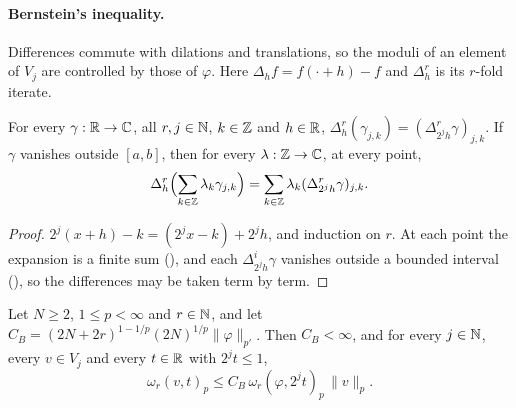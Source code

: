 \paragraph{Bernstein's inequality.}
Differences commute with dilations and translations, so the moduli of an element of $V_j$ are
controlled by those of $\varphi$. Here $\Delta_h f = f(\cdot + h) - f$ and $\Delta_h^r$ is its
$r$-fold iterate.

\begin{lemma}
\label{lem:daub-expansion-differences}
\leanok
{}
For every $\gamma : \mathbb{R} \to \mathbb{C}$, all $r, j \in \mathbb{N}$, $k \in \mathbb{Z}$ and $h \in \mathbb{R}$,
$\Delta_h^r (\gamma_{j,k}) = (\Delta_{2^j h}^r \gamma)_{j,k}$. If $\gamma$ vanishes outside
$[a, b]$, then for every $\lambda : \mathbb{Z} \to \mathbb{C}$, at every point,
\[
  \Delta_h^r \Bigl(\sum_{k \in \mathbb{Z}} \lambda_k \gamma_{j,k}\Bigr)
  = \sum_{k \in \mathbb{Z}} \lambda_k (\Delta_{2^j h}^r \gamma)_{j,k} .
\]
\end{lemma}

\begin{proof}
\leanok
{}
$2^j (x + h) - k = (2^j x - k) + 2^j h$, and induction on $r$. At each point the expansion is a
finite sum (), and each $\Delta_{2^j h}^i \gamma$ vanishes outside a
bounded interval (), so the differences may be taken term by
term.
\end{proof}

\begin{theorem}
\label{thm:daub-bernstein}
\leanok
{}
Let $N \geq 2$, $1 \leq p < \infty$ and $r \in \mathbb{N}$, and let
$C_B = (2N + 2r)^{1 - 1/p} (2N)^{1/p} \|\varphi\|_{p'}$. Then $C_B < \infty$, and for every
$j \in \mathbb{N}$, every $v \in V_j$ and every $t \in \mathbb{R}$ with $2^j t \leq 1$,
\[
  \omega_r(v, t)_p \leq C_B \, \omega_r(\varphi, 2^j t)_p \, \|v\|_p .
\]
\end{theorem}

